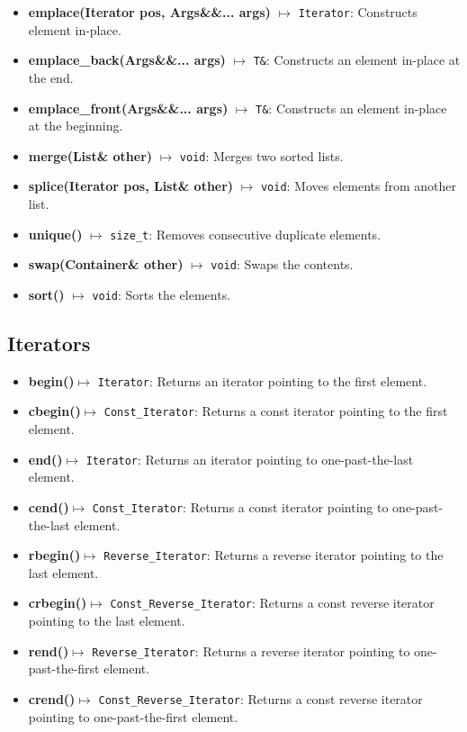 \documentclass{report}
\begin{document}
\begin{itemize}
        \item \textbf{emplace(Iterator pos, Args\&\&... args)} $\mapsto$ \texttt{Iterator}: Constructs element in-place.
        \item \textbf{emplace\_back(Args\&\&... args)} $\mapsto$ \texttt{T\&}: Constructs an element in-place at the end.
        \item \textbf{emplace\_front(Args\&\&... args)} $\mapsto$ \texttt{T\&}: Constructs an element in-place at the beginning.
        \item \textbf{merge(List\& other)} $\mapsto$ \texttt{void}: Merges two sorted lists.
        \item \textbf{splice(Iterator pos, List\& other)} $\mapsto$ \texttt{void}: Moves elements from another list.
        \item \textbf{unique()} $\mapsto$ \texttt{size\_t}: Removes consecutive duplicate elements.
        \item \textbf{swap(Container\& other)} $\mapsto$ \texttt{void}: Swaps the contents.
        \item \textbf{sort()} $\mapsto$ \texttt{void}: Sorts the elements.
    \end{itemize}

    \bigbreak \noindent 
    \subsection{Iterators}
    \begin{itemize}
         \item \textbf{begin()}\(\mapsto\) \texttt{Iterator}: Returns an iterator pointing to the first element.
        \item \textbf{cbegin()}\(\mapsto\) \texttt{Const\_Iterator}: Returns a const iterator pointing to the first element.
        \item \textbf{end()}\(\mapsto\) \texttt{Iterator}: Returns an iterator pointing to one-past-the-last element.
        \item \textbf{cend()}\(\mapsto\) \texttt{Const\_Iterator}: Returns a const iterator pointing to one-past-the-last element.
        \item \textbf{rbegin()}\(\mapsto\) \texttt{Reverse\_Iterator}: Returns a reverse iterator pointing to the last element.
        \item \textbf{crbegin()}\(\mapsto\) \texttt{Const\_Reverse\_Iterator}: Returns a const reverse iterator pointing to the last element.
        \item \textbf{rend()}\(\mapsto\) \texttt{Reverse\_Iterator}: Returns a reverse iterator pointing to one-past-the-first element.
        \item \textbf{crend()}\(\mapsto\) \texttt{Const\_Reverse\_Iterator}: Returns a const reverse iterator pointing to one-past-the-first element.
    \end{itemize}
\end{document}
